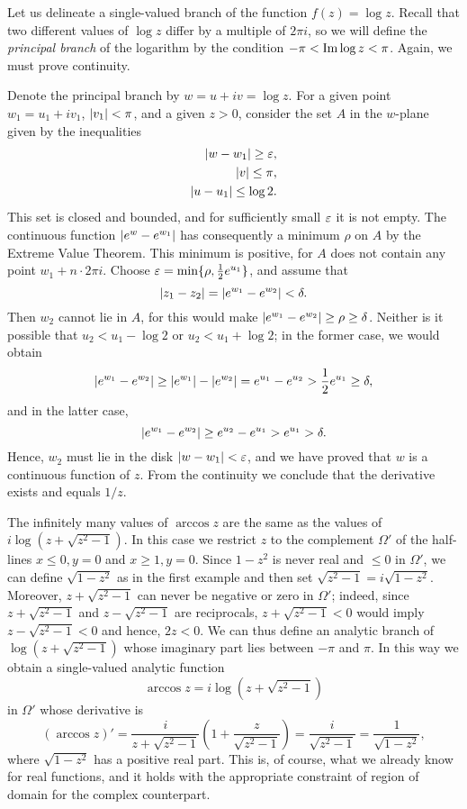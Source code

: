 \begin{example}
	Let us delineate a single-valued branch of the function $f(z)=\log z$. Recall that two different values of $\log z$ differ by a multiple of $2\pi i$, so we will define the \emph{principal branch} of the logarithm by the condition $-\pi<\operatorname{Im} \log z<\pi$. Again, we must prove continuity.
	
	Denote the principal branch by $w=u+iv=\log z$. For a given point $w_1=u_1+iv_1$, $\lvert v_1 \rvert<\pi$, and a given $z>0$, consider the set $A$ in the $w$-plane given by the inequalities
	\begin{align*}
		\lvert w-w_1 \rvert \ge \varepsilon, \\
		\lvert v \rvert \le \pi, \\
		\lvert u-u_1 \rvert \le \log 2.
	\end{align*}
	This set is closed and bounded, and for sufficiently small $\varepsilon$ it is not empty. The continuous function $\lvert e^w-e^{w_1} \rvert$ has consequently a minimum $\rho$ on $A$ by the Extreme Value Theorem. This minimum is positive, for $A$ does not contain any point $w_1+n \cdot 2\pi i$. Choose $\varepsilon=\min\{\rho, \frac{1}{2}e^{u_1}\}$, and assume that $$\lvert z_1-z_2 \rvert=\lvert e^{w_1}-e^{w_2} \rvert<\delta.$$ Then $w_2$ cannot lie in $A$, for this would make $\lvert e^{w_1}-e^{w_2} \rvert \ge \rho \ge \delta$. Neither is it possible that $u_2<u_1-\log 2$ or $u_2<u_1+\log 2$; in the former case, we would obtain $$\lvert e^{w_1}-e^{w_2} \rvert \ge \lvert e^{w_1} \rvert-\lvert e^{w_2} \rvert=e^{u_1}-e^{u_2}>\dfrac{1}{2}e^{u_1} \ge \delta,$$ and in the latter case, $$\lvert e^{w_1}-e^{w_2} \rvert \ge e^{u_2}-e^{u_1}>e^{u_1}>\delta.$$ Hence, $w_2$ must lie in the disk $\lvert w-w_1 \rvert<\varepsilon$, and we have proved that $w$ is a continuous function of $z$. From the continuity we conclude that the derivative exists and equals $1/z$.
\end{example}

\begin{example}
	The infinitely many values of $\arccos z$ are the same as the values of $i \log(z+\sqrt{z^2-1})$. In this case we restrict $z$ to the complement $\Omega'$ of the half-lines $x \le 0, y=0$ and $x \ge 1, y=0$. Since $1-z^2$ is never real and $\le 0$ in $\Omega'$, we can define $\sqrt{1-z^2}$ as in the first example and then set $\sqrt{z^2-1}=i\sqrt{1-z^2}$. Moreover, $z+\sqrt{z^2-1}$ can never be negative or zero in $\Omega'$; indeed, since $z+\sqrt{z^2-1}$ and $z-\sqrt{z^2-1}$ are reciprocals, $z+\sqrt{z^2-1}<0$ would imply $z-\sqrt{z^2-1}<0$ and hence, $2z<0$. We can thus define an analytic branch of $\log(z+\sqrt{z^2-1})$ whose imaginary part lies between $-\pi$ and $\pi$. In this way we obtain a single-valued analytic function $$\arccos z=i\log(z+\sqrt{z^2-1})$$ in $\Omega'$ whose derivative is $$(\arccos z)'=\dfrac{i}{z+\sqrt{z^2-1}}\left(1+\dfrac{z}{\sqrt{z^2-1}}\right)=\dfrac{i}{\sqrt{z^2-1}}=\dfrac{1}{\sqrt{1-z^2}},$$ where $\sqrt{1-z^2}$ has a positive real part. This is, of course, what we already know for real functions, and it holds with the appropriate constraint of region of domain for the complex counterpart.
\end{example}

